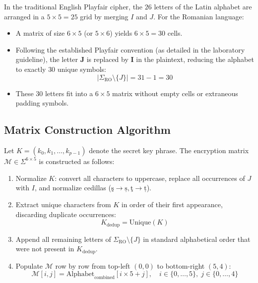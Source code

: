 \documentclass[12pt,a4paper]{article}
\begin{document}
In the traditional English Playfair cipher, the $26$ letters of the Latin alphabet are arranged in a $5 \times 5 = 25$ grid by merging $I$ and $J$. For the Romanian language:
\begin{itemize}
    \item A matrix of size $6 \times 5$ (or $5 \times 6$) yields $6 \times 5 = 30$ cells.
    \item Following the established Playfair convention (as detailed in the laboratory guideline), the letter \textbf{J} is replaced by \textbf{I} in the plaintext, reducing the alphabet to exactly $30$ unique symbols:
    \begin{equation}
        |\Sigma_{\text{RO}} \setminus \{J\}| = 31 - 1 = 30
    \end{equation}
    \item These $30$ letters fit into a $6 \times 5$ matrix without empty cells or extraneous padding symbols.
\end{itemize}

\subsection{Matrix Construction Algorithm}
Let $K = (k_0, k_1, \dots, k_{p-1})$ denote the secret key phrase. The encryption matrix $\mathcal{M} \in \Sigma^{6 \times 5}$ is constructed as follows:
\begin{enumerate}
    \item Normalize $K$: convert all characters to uppercase, replace all occurrences of $J$ with $I$, and normalize cedillas ($\text{ş} \to \text{ș}, \text{ţ} \to \text{ț}$).
    \item Extract unique characters from $K$ in order of their first appearance, discarding duplicate occurrences:
    \begin{equation}
        K_{\text{dedup}} = \text{Unique}(K)
    \end{equation}
    \item Append all remaining letters of $\Sigma_{\text{RO}} \setminus \{J\}$ in standard alphabetical order that were not present in $K_{\text{dedup}}$.
    \item Populate $\mathcal{M}$ row by row from top-left $(0, 0)$ to bottom-right $(5, 4)$:
    \begin{equation}
        \mathcal{M}[i, j] = \text{Alphabet}_{\text{combined}}[i \times 5 + j], \quad i \in \{0, \dots, 5\}, \; j \in \{0, \dots, 4\}
    \end{equation}
\end{enumerate}
\end{document}
